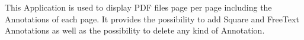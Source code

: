 This Application is used to display P\-D\-F files page per page including the Annotations of each page. It provides the possibility to add Square and Free\-Text Annotations as well as the possibility to delete any kind of Annotation. 